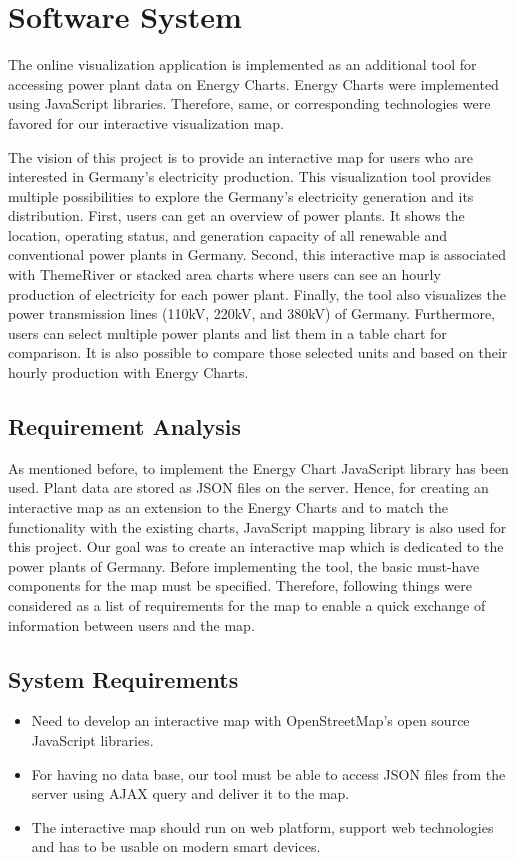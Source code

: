 \chapter{Software System}
\label{chap:softwareSystem}

The online visualization application is implemented as an additional tool for accessing power plant data on Energy Charts. Energy Charts were implemented using JavaScript libraries. Therefore, same, or corresponding technologies were favored for our interactive visualization map. 

The vision of this project is to provide an interactive map for users who are interested in Germany’s electricity production.  This visualization tool provides multiple possibilities to explore the Germany’s electricity generation and its distribution. First, users can get an overview of power plants. It shows the location, operating status, and generation capacity of all renewable and conventional power plants in Germany. Second, this interactive map is associated with ThemeRiver or stacked area charts where users can see an hourly production of electricity for each power plant. Finally, the tool also visualizes the power transmission lines (110kV, 220kV, and 380kV) of Germany. Furthermore, users can select multiple power plants and list them in a table chart for comparison. It is also possible to compare those selected units and based on their hourly production with Energy Charts. 

\section{Requirement Analysis}
\label{sec:reqAn}

As mentioned before, to implement the Energy Chart JavaScript library has been used. Plant data are stored as JSON files on the server. Hence, for creating an interactive map as an extension to the Energy Charts and to match the functionality with the existing charts, JavaScript mapping library is also used for this project. Our goal was to create an interactive map which is dedicated to the power plants of Germany. Before implementing the tool, the basic must-have components for the map must be specified. Therefore, following things were considered as a list of requirements for the map to enable a quick exchange of information between users and the map.

\section*{System Requirements}
\begin{itemize}
	\item{Need to develop an interactive map with OpenStreetMap's open source JavaScript libraries.}
	\item{For having no data base, our tool must be able to access JSON files from the server using AJAX query and deliver it to the map.}
	\item{The interactive map should run on web platform, support web technologies and has to be usable on modern smart devices.}
\end{itemize}

